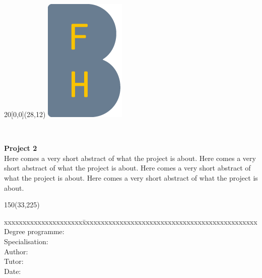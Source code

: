 
\begin{titlepage}

\setlength{\unitlength}{1mm}

\begin{textblock}{20}[0,0](28,12)
    \includegraphics[scale=1.0]{../img/BFH_Logo_B.png}
\end{textblock}

\begin{flushleft}

\vspace*{21mm}

\fontsize{26pt}{40pt}\selectfont
{\doctitle}	\\
\vspace{2mm}

\fontsize{16pt}{24pt}\selectfont\vspace{0.3em}
\docsubtitle
\vspace{5mm}

\fontsize{10pt}{12pt}\selectfont
\textbf{Project 2} \\

\fontsize{10pt}{12pt}\selectfont
Here comes a very short abstract of what the project is about. Here comes a very short abstract of what the project is about. Here comes a very short abstract of what the project is about. Here comes a very short abstract of what the project is about. 

\begin{textblock}{150}(33,225)
\fontsize{10pt}{17pt}
\begin{tabbing}
xxxxxxxxxxxxxxxxxxxxx\=xxxxxxxxxxxxxxxxxxxxxxxxxxxxxxxxxxxxxxxxxxxxxxx \kill
Degree programme:	\> \fieldofstudies	\\
Specialisation:	    \> \specialisation	\\
Author:		        \> \docauthor \\
Tutor:	            \> \prof \\
Date:			    \> \versiondate \\
\end{tabbing}


\end{textblock}
\end{flushleft}
\end{titlepage}
